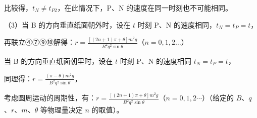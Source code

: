 \documentclass[\gkver]{gaokaozhenti}
\begin{document}
\begin{enumerate}
{比较得，$t_N\neq t_{P2}$，在此情况下，P、N 的速度在同一时刻也不可能相同。

（3）当 B 的方向垂直纸面朝外时，设在 $t$ 时刻 P、N 的速度相同，$t_N=t_P=t$，

再联立④⑦⑨⑩解得：$r=\frac{[(2n+1)\pi+\theta]m^{2}g}{B^{2}q^{2}\sin\theta}$（$n=0,1,2\ldots$）

当 B 的方向垂直纸面朝里时，设在 $t$ 时刻 P、N 的速度相同 $t_N=t_P=t$，

同理得：$r=\frac{(\pi-\theta)m^{2}g}{B^{2}q^{2}\sin\theta}$，

考虑圆周运动的周期性，有：$r=\frac{[(2n+1)\pi+\theta]m^{2}g}{B^{2}q^{2}\sin\theta}$（$n=0,1,2\cdots$）（给定的 $B$、$q$、$r$、$m$、$\theta$ 等物理量决定 $n$ 的取值）。
}

\end{enumerate}
\end{document}

